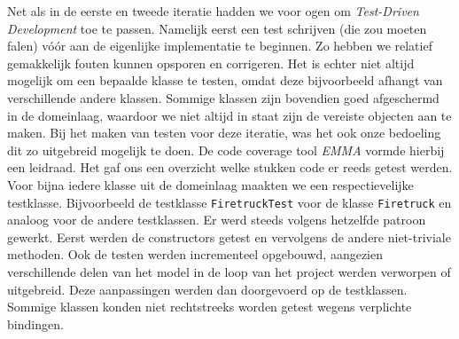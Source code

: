 \label{testen}
Net als in de eerste en tweede iteratie hadden we voor ogen om \textit{Test-Driven Development} toe te passen.
Namelijk eerst een test schrijven (die zou moeten falen) v\'o\'or aan de eigenlijke implementatie te beginnen.
Zo hebben we relatief gemakkelijk fouten kunnen opsporen en corrigeren. Het is echter niet altijd mogelijk om een bepaalde klasse te testen, omdat deze bijvoorbeeld afhangt van verschillende andere klassen. Sommige klassen zijn bovendien goed afgeschermd in de domeinlaag, waardoor we niet altijd in staat zijn de vereiste objecten aan te maken.
Bij het maken van testen voor deze iteratie, was het ook onze bedoeling dit zo uitgebreid mogelijk te doen.
De code coverage tool \textit{EMMA} vormde hierbij een leidraad. Het gaf ons een overzicht welke stukken code er reeds getest werden.
Voor bijna iedere klasse uit de domeinlaag maakten we een respectievelijke testklasse.
Bijvoorbeeld de testklasse \texttt{FiretruckTest} voor de klasse \texttt{Firetruck} en analoog voor de andere testklassen.
Er werd steeds volgens hetzelfde patroon gewerkt. Eerst werden de constructors getest en vervolgens de andere niet-triviale methoden.
Ook de testen werden incrementeel opgebouwd, aangezien verschillende delen van het model in de loop van het project werden verworpen of uitgebreid.
Deze aanpassingen werden dan doorgevoerd op de testklassen. Sommige klassen konden niet rechtstreeks worden getest wegens verplichte bindingen.